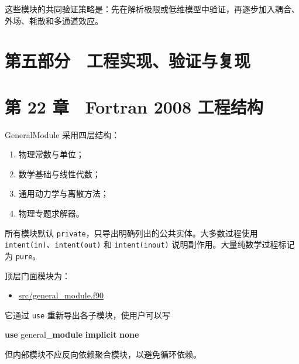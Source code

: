\documentclass[
  a4paper,
]{ctexbook}
\newenvironment{Shaded}{}{}
\newcommand{\KeywordTok}[1]{\textcolor[rgb]{0.00,0.44,0.13}{\textbf{#1}}}
\newcommand{\NormalTok}[1]{#1}
\providecommand{\tightlist}{%
  \setlength{\itemsep}{0pt}\setlength{\parskip}{0pt}}
\begin{document}
这些模块的共同验证策略是：先在解析极限或低维模型中验证，再逐步加入耦合、外场、耗散和多通道效应。

\hypertarget{ux7b2cux4e94ux90e8ux5206-ux5de5ux7a0bux5b9eux73b0ux9a8cux8bc1ux4e0eux590dux73b0}{%
\section{第五部分　工程实现、验证与复现}\label{ux7b2cux4e94ux90e8ux5206-ux5de5ux7a0bux5b9eux73b0ux9a8cux8bc1ux4e0eux590dux73b0}}

\hypertarget{ux7b2c-22-ux7ae0-fortran-2008-ux5de5ux7a0bux7ed3ux6784}{%
\section{第 22 章　Fortran 2008
工程结构}\label{ux7b2c-22-ux7ae0-fortran-2008-ux5de5ux7a0bux7ed3ux6784}}

GeneralModule 采用四层结构：

\begin{enumerate}
\def\labelenumi{\arabic{enumi}.}
\tightlist
\item
  物理常数与单位；
\item
  数学基础与线性代数；
\item
  通用动力学与离散方法；
\item
  物理专题求解器。
\end{enumerate}

所有模块默认 \texttt{private}，只导出明确列出的公共实体。大多数过程使用
\texttt{intent(in)}、\texttt{intent(out)} 和 \texttt{intent(inout)}
说明副作用。大量纯数学过程标记为 \texttt{pure}。

顶层门面模块为：

\begin{itemize}
\tightlist
\item
  \href{https://github.com/l1Ha/QuantumGeneralModule/blob/main/src/general_module.f90}{src/general\_module.f90}
\end{itemize}

它通过 \texttt{use} 重新导出各子模块，使用户可以写

\begin{Shaded}
\begin{Highlighting}[]
\KeywordTok{use}\NormalTok{ general\_}\KeywordTok{module}
\KeywordTok{implicit} \KeywordTok{none}
\end{Highlighting}
\end{Shaded}

但内部模块不应反向依赖聚合模块，以避免循环依赖。
\end{document}
